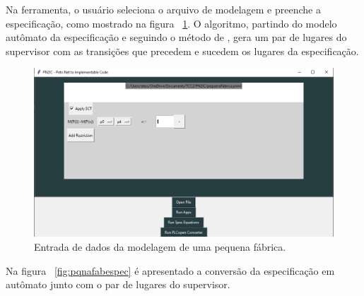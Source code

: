 Na ferramenta, o usu\'ario seleciona o arquivo de modelagem e preenche a especifica\c{c}\~ao, como mostrado na figura ~\ref{fig:pqnafabentrada}. O algoritmo, partindo do modelo aut\^omato da especifica\c{c}\~ao e seguindo o m\'etodo de \cite{UzamWonham2005}, gera um par de lugares do supervisor com as transi\c{c}\~oes que precedem e sucedem os lugares da especifica\c{c}\~ao.

\begin{figure}[!htb]
	\caption[Entrada de dados da modelagem de uma pequena f\'abrica.]{Entrada de dados da modelagem de uma pequena f\'abrica.}
	\label{fig:pqnafabentrada}
	\includegraphics[width=16cm]{./figuras/PQNAFABENTRADA.png}\centering
\end{figure}

Na figura ~\ref{fig:pqnafabespec} \'e apresentado a convers\~ao da especifica\c{c}\~ao em aut\^omato junto com o par de lugares do supervisor. 

